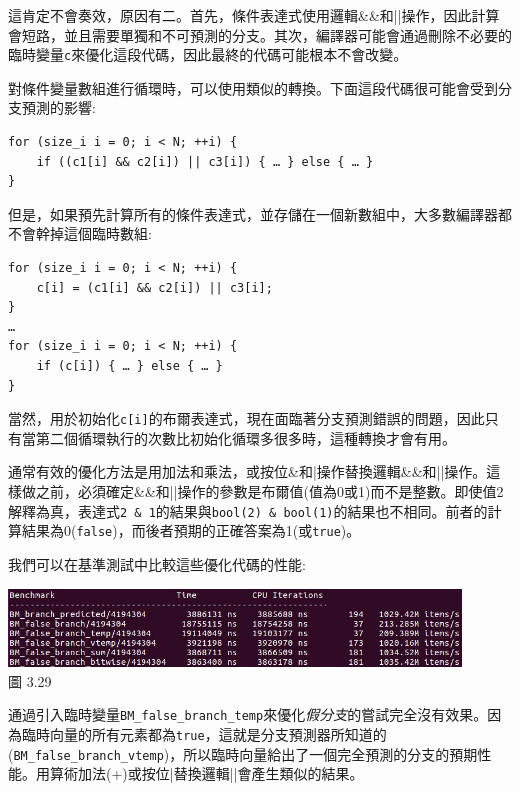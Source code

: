 這肯定不會奏效，原因有二。首先，條件表達式使用邏輯\&\&和||操作，因此計算會短路，並且需要單獨和不可預測的分支。其次，編譯器可能會通過刪除不必要的臨時變量\texttt{c}來優化這段代碼，因此最終的代碼可能根本不會改變。

對條件變量數組進行循環時，可以使用類似的轉換。下面這段代碼很可能會受到分支預測的影響:

\begin{lstlisting}[style=styleCXX]
for (size_i i = 0; i < N; ++i) {
	if ((c1[i] && c2[i]) || c3[i]) { … } else { … }
}
\end{lstlisting}

但是，如果預先計算所有的條件表達式，並存儲在一個新數組中，大多數編譯器都不會幹掉這個臨時數組:

\begin{lstlisting}[style=styleCXX]
for (size_i i = 0; i < N; ++i) {
	c[i] = (c1[i] && c2[i]) || c3[i];
}
…
for (size_i i = 0; i < N; ++i) {
	if (c[i]) { … } else { … }
}
\end{lstlisting}

當然，用於初始化\texttt{c[i]}的布爾表達式，現在面臨著分支預測錯誤的問題，因此只有當第二個循環執行的次數比初始化循環多很多時，這種轉換才會有用。

通常有效的優化方法是用加法和乘法，或按位\&和|操作替換邏輯\&\&和||操作。這樣做之前，必須確定\&\&和||操作的參數是布爾值(值為0或1)而不是整數。即使值2解釋為真，表達式\texttt{2 \& 1}的結果與\texttt{bool(2) \& bool(1)}的結果也不相同。前者的計算結果為0(\texttt{false})，而後者預期的正確答案為1(或\texttt{true})。

我們可以在基準測試中比較這些優化代碼的性能:

\begin{center}
\includegraphics[width=0.9\textwidth]{content/1/chapter3/images/29.jpg}\\
圖 3.29
\end{center}

通過引入臨時變量\texttt{BM\_false\_branch\_temp}來優化\textit{假分支}的嘗試完全沒有效果。因為臨時向量的所有元素都為\texttt{true}，這就是分支預測器所知道的(\texttt{BM\_false\_branch\_vtemp})，所以臨時向量給出了一個完全預測的分支的預期性能。用算術加法(+)或按位|替換邏輯||會產生類似的結果。

